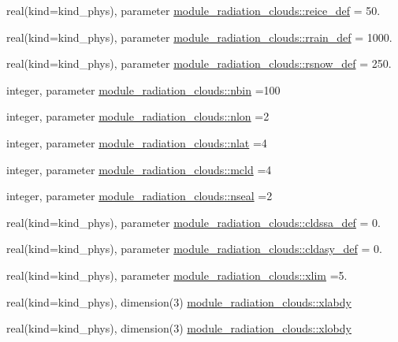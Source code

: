 \begin{DoxyCompactItemize}
\item 
real(kind=kind\+\_\+phys), parameter \hyperlink{group__module__radiation__clouds_ga721e0fb4a34774f5b61f567b9cad8e7b}{module\+\_\+radiation\+\_\+clouds\+::reice\+\_\+def} = 50.
\item 
real(kind=kind\+\_\+phys), parameter \hyperlink{group__module__radiation__clouds_ga93fcaedae02c0f9c4de9f39061379d6b}{module\+\_\+radiation\+\_\+clouds\+::rrain\+\_\+def} = 1000.
\item 
real(kind=kind\+\_\+phys), parameter \hyperlink{group__module__radiation__clouds_ga2b68c4a206e17cb59597f6c4dffc7c1a}{module\+\_\+radiation\+\_\+clouds\+::rsnow\+\_\+def} = 250.
\item 
integer, parameter \hyperlink{group__module__radiation__clouds_gad2947b3c0a8382fbe12b76dd68b290e0}{module\+\_\+radiation\+\_\+clouds\+::nbin} =100
\item 
integer, parameter \hyperlink{group__module__radiation__clouds_gab4d14edea12bbcda5361cad523386c7c}{module\+\_\+radiation\+\_\+clouds\+::nlon} =2
\item 
integer, parameter \hyperlink{group__module__radiation__clouds_gad4274cb223949e858ecc2e6346bed610}{module\+\_\+radiation\+\_\+clouds\+::nlat} =4
\item 
integer, parameter \hyperlink{group__module__radiation__clouds_gafb94f3d62afa49bef6c33f73a7ecad65}{module\+\_\+radiation\+\_\+clouds\+::mcld} =4
\item 
integer, parameter \hyperlink{group__module__radiation__clouds_gaaf2a6549a8c42b9eae3d40d21d1e9532}{module\+\_\+radiation\+\_\+clouds\+::nseal} =2
\item 
real(kind=kind\+\_\+phys), parameter \hyperlink{group__module__radiation__clouds_ga2ce850be46f0144caa09309ae01958c2}{module\+\_\+radiation\+\_\+clouds\+::cldssa\+\_\+def} = 0.
\item 
real(kind=kind\+\_\+phys), parameter \hyperlink{group__module__radiation__clouds_gab94e45a81d8be82b6cb686b35fd78a80}{module\+\_\+radiation\+\_\+clouds\+::cldasy\+\_\+def} = 0.
\item 
real(kind=kind\+\_\+phys), parameter \hyperlink{group__module__radiation__clouds_ga1146f43b680b655d354a9c031ee4a463}{module\+\_\+radiation\+\_\+clouds\+::xlim} =5.
\item 
real(kind=kind\+\_\+phys), dimension(3) \hyperlink{group__module__radiation__clouds_gab2a798da0bb0125d1d5074b73c5951dc}{module\+\_\+radiation\+\_\+clouds\+::xlabdy}
\item 
real(kind=kind\+\_\+phys), dimension(3) \hyperlink{group__module__radiation__clouds_gaab28f783919380e5ff7f925f70355a57}{module\+\_\+radiation\+\_\+clouds\+::xlobdy}

\end{DoxyCompactItemize}
